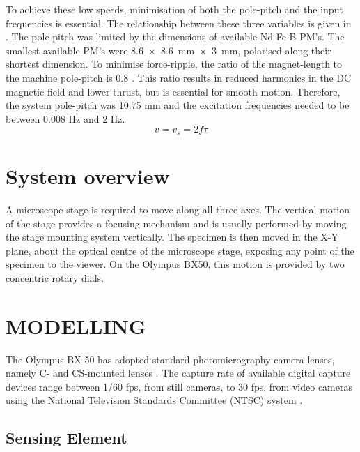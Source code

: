 \documentclass[10pt,twocolumn]{witseiepaper}
\begin{document}
To achieve these low speeds, minimisation of both the pole-pitch and the input
frequencies is essential.  The relationship between these three variables is
given in .  The pole-pitch was limited by the dimensions of
available Nd-Fe-B PM's.  The smallest available PM's were \mbox{8.6 $\times$
8.6 mm $\times$ 3 mm}, polarised along their shortest dimension. To minimise
force-ripple, the ratio of the magnet-length to the machine pole-pitch is
0.8 \cite{Tubular}.  This ratio results in reduced harmonics in the DC magnetic
field and lower thrust, but is essential for smooth motion. Therefore, the
system pole-pitch was 10.75 mm and the excitation frequencies needed to be
between 0.008 Hz and 2 Hz.
\begin{equation}
	v = v_s = 2f\tau
	\label{eqn:Speed}
\end{equation}

\section{System overview}

A microscope stage is required to move along all three axes.  The vertical
motion of the stage provides a focusing mechanism and is usually performed by
moving the stage mounting system vertically.  The specimen is then moved in
the X-Y plane, about the optical centre of the microscope stage, exposing any
point of the specimen to the viewer.  On the Olympus BX50, this motion is
provided by two concentric rotary dials.
 

\section{MODELLING}

The Olympus BX-50 has adopted standard photomicrography camera lenses, namely
C- and CS-mounted lenses \cite{Olympus}.  The capture rate of available
digital capture devices range between 1/60 fps, from still cameras, to 30 fps,
from video cameras using the National Television Standards Committee (NTSC)
system \cite{Olympus}.

\subsection{Sensing Element}
\end{document}
